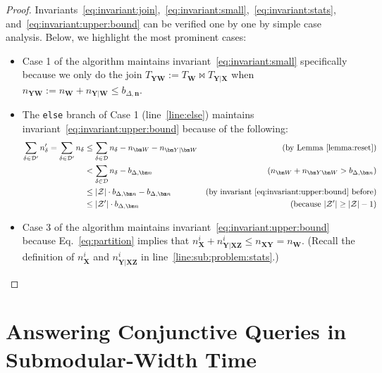 \documentclass{theoretics}
\newcommand{\calD}{\mathcal D}
\newcommand{\calZ}{\mathcal Z}
\begin{document}
\begin{proof}
  Invariants~\eqref{eq:invariant:join},~\eqref{eq:invariant:small},~\eqref{eq:invariant:stats},
  and~\eqref{eq:invariant:upper:bound} can be verified one by one by simple case analysis.
  Below, we highlight the most prominent cases:
  \begin{itemize}
    \item Case 1 of the algorithm maintains invariant~\eqref{eq:invariant:small} specifically
    because we only do the join $T_{\bm Y\bm W} := T_{\bm W} \Join T_{\bm Y|\bm X}$
    when $n_{\bm Y\bm W} := n_{\bm W}+n_{\bm Y|\bm W} \leq b_{\Delta,\bm n}$.
    \item The {\tt else} branch of Case 1 (line~\ref{line:else}) maintains invariant~\eqref{eq:invariant:upper:bound} because of the following:
    \begin{align*}
        \sum_{\delta \in \calD'}n'_{\delta} = \sum_{\delta \in \calD'}n_{\delta} &\leq
        \sum_{\delta \in \calD}n_{\delta} - n_{\bm W} - n_{\bm Y|\bm W}&\text{(by Lemma~\ref{lemma:reset})}\\
        &<\sum_{\delta \in \calD}n_{\delta} - b_{\Delta,\bm n}&\text{($n_{\bm W} + n_{\bm Y\bm W} > b_{\Delta, \bm n}$)}\\
        &\leq |\calZ|\cdot b_{\Delta,\bm n} - b_{\Delta,\bm n}&\text{(by invariant~\eqref{eq:invariant:upper:bound} before)}\\
        &\leq |\calZ'|\cdot b_{\Delta,\bm n}&\text{(because $|\calZ'| \geq |\calZ| - 1$)}
    \end{align*}
    \item Case 3 of the algorithm maintains invariant~\eqref{eq:invariant:upper:bound}
    because Eq.~\eqref{eq:partition} implies that $n_{\bm X}^i + n_{\bm Y | \bm X \bm Z}^i \leq
    n_{\bm X\bm Y} = n_{\bm W}$. (Recall the definition of $n_{\bm X}^i$ and $n_{\bm Y | \bm X \bm Z}^i$ in line~\ref{line:sub:problem:stats}.)\qedhere
  \end{itemize}
\end{proof}


\section{Answering Conjunctive Queries in Submodular-Width Time}
\label{sec:subw}
\end{document}
